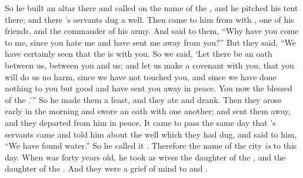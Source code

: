 \bverse So he built an altar there and called on the name of the \lord, and he pitched his tent there; and there \Isaac's servants dug a well.
\bverse Then  came to him from  with , one of his friends, and  the commander of his army.
\bverse And \Isaac said to them, ``Why have you come to me, since you hate me and have sent me away from you?''
\bverse But they said, ``We have certainly seen that the \lord is with you. So we said, `Let there be an oath between us, between you and us; and let us make a covenant with you,
\bverse that you will do us no harm, since we have not touched you, and since we have done nothing to you but good and have sent you away in peace. You \are now the blessed of the \lord.'\thinspace''
\bverse So he made them a feast, and they ate and drank.
\bverse Then they arose early in the morning and swore an oath with one another; and \Isaac sent them away, and they departed from him in peace.
\bverse It came to pass the same day that \Isaac's servants came and told him about the well which they had dug, and said to him, ``We have found water.''
\bverse So he called it . Therefore the name of the city \textit{is} \Beersheba to this day.
\bverse When \Esau was forty years old, he took as wives  the daughter of  the , and  the daughter of  the .
\bverse And they were a grief of mind to \Isaac and \Rebekah.
